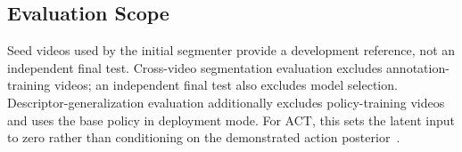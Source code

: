 \subsection{Evaluation Scope}
\label{app:datascope}
Seed videos used by the initial segmenter provide a development reference, not an independent final test.
Cross-video segmentation evaluation excludes annotation-training videos; an independent final test also excludes model selection.
Descriptor-generalization evaluation additionally excludes policy-training videos and uses the base policy in deployment mode.
For ACT, this sets the latent input to zero rather than conditioning on the demonstrated action posterior~\cite{zhao2023act}.
